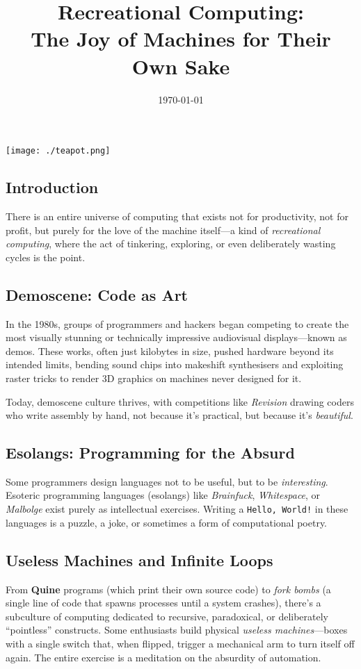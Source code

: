 \documentclass[12pt]{article}
\title{Recreational Computing: \\The Joy of Machines for Their Own Sake}
\author{}
\date{\today}
\begin{document}
\maketitle

\begin{minipage}{0.15\textwidth}
    \texttt{[image: ./teapot.png]} %
\end{minipage}

\subsection*{Introduction}
There is an entire universe of computing that exists not for productivity, not for profit, but purely for the love of the machine itself---a kind of \textit{recreational computing}, where the act of tinkering, exploring, or even deliberately wasting cycles is the point.

\subsection*{Demoscene: Code as Art}
In the 1980s, groups of programmers and hackers began competing to create the most visually stunning or technically impressive audiovisual displays---known as demos. These works, often just kilobytes in size, pushed hardware beyond its intended limits, bending sound chips into makeshift synthesisers and exploiting raster tricks to render 3D graphics on machines never designed for it. 

Today, demoscene culture thrives, with competitions like \textit{Revision} drawing coders who write assembly by hand, not because it’s practical, but because it’s \textit{beautiful}.

\subsection*{Esolangs: Programming for the Absurd}
Some programmers design languages not to be useful, but to be \textit{interesting}. Esoteric programming languages (esolangs) like \textit{Brainfuck}, \textit{Whitespace}, or \textit{Malbolge} exist purely as intellectual exercises. Writing a \texttt{Hello, World!} in these languages is a puzzle, a joke, or sometimes a form of computational poetry.

\subsection*{Useless Machines and Infinite Loops}
From \textbf{Quine} programs (which print their own source code) to \textit{fork bombs} (a single line of code that spawns processes until a system crashes), there’s a subculture of computing dedicated to recursive, paradoxical, or deliberately ``pointless'' constructs. Some enthusiasts build physical \textit{useless machines}---boxes with a single switch that, when flipped, trigger a mechanical arm to turn itself off again. The entire exercise is a meditation on the absurdity of automation.
\end{document}
